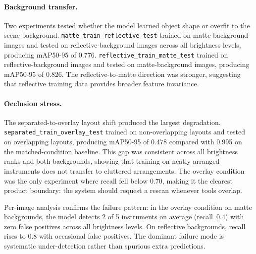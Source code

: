 \documentclass[10pt,a4paper]{article}
\begin{document}
\paragraph{Background transfer.}
Two experiments tested whether the model learned object shape or
overfit to the scene background. \texttt{matte\_train\_reflective\_test}
trained on matte-background images and tested on reflective-background
images across all brightness levels, producing mAP50-95 of 0.776.
\texttt{reflective\_train\_matte\_test} trained on reflective-background
images and tested on matte-background images, producing mAP50-95 of
0.826. The reflective-to-matte direction was stronger, suggesting that
reflective training data provides broader feature invariance.
\paragraph{Occlusion stress.}
The separated-to-overlay layout shift produced the largest degradation.
\texttt{separated\_train\_overlay\_test} trained on non-overlapping
layouts and tested on overlapping layouts, producing mAP50-95 of 0.478
compared with 0.995 on the matched-condition baseline. This gap was
consistent across all brightness ranks and both backgrounds, showing
that training on neatly arranged instruments does not transfer to
cluttered arrangements. The overlay condition was the only experiment
where recall fell below 0.70, making it the clearest product boundary:
the system should request a rescan whenever tools overlap.

Per-image analysis confirms the failure pattern: in the overlay condition
on matte backgrounds, the model detects 2 of 5 instruments on average
(recall~0.4) with zero false positives across all brightness levels. On
reflective backgrounds, recall rises to 0.8 with occasional false
positives. The dominant failure mode is systematic under-detection
rather than spurious extra predictions.
\end{document}
